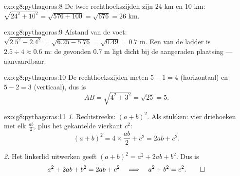 \begin{solution}{exo:g8:pythagoras:8}
De twee rechthoekszijden zijn $24$ km en $10$ km:
$\sqrt{24^2 + 10^2} = \sqrt{576 + 100} = \sqrt{676} = 26$ km.
\end{solution}

\begin{solution}{exo:g8:pythagoras:9}
Afstand van de voet: $\sqrt{2.5^2 - 2.4^2} = \sqrt{6.25 - 5.76} =
\sqrt{0.49} = 0.7$ m. Een  van de ladder is $2.5 \div 4 \approx 0.6$ m: de
gevonden $0.7$ m ligt dicht bij de aangeraden plaatsing --- aanvaardbaar.
\end{solution}

\begin{solution}{exo:g8:pythagoras:10}
De rechthoekszijden meten $5 - 1 = 4$ (horizontaal) en $5 - 2 = 3$ (verticaal),
dus is
\[
AB = \sqrt{4^2 + 3^2} = \sqrt{25} = 5 .
\]
\end{solution}

\begin{solution}{exo:g8:pythagoras:11}
\emph{1.} Rechtstreeks: $(a + b)^2$. Als stukken: vier driehoeken met elk
 $\frac{ab}{2}$, plus het gekantelde vierkant $c^2$:
\[
(a + b)^2 = 4 \times \frac{ab}{2} + c^2 = 2ab + c^2 .
\]

\emph{2.} Het linkerlid uitwerken geeft $(a+b)^2 = a^2 + 2ab + b^2$. Dus is
\[
a^2 + 2ab + b^2 = 2ab + c^2
\quad\Longrightarrow\quad
a^2 + b^2 = c^2 . \qed
\]
\end{solution}

